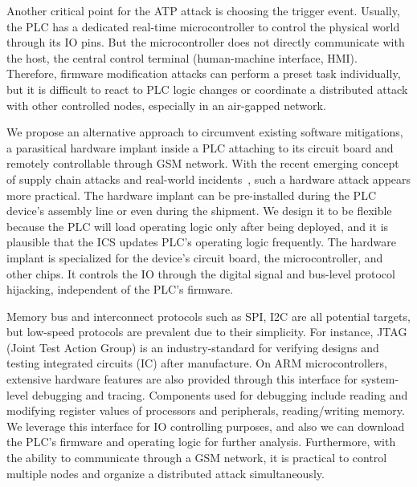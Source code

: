 Another critical point for the ATP attack is choosing the trigger event. Usually, the PLC has a dedicated real-time microcontroller to control the physical world through its IO pins. But the microcontroller does not directly communicate with the host, the central control terminal (human-machine interface, HMI). Therefore, firmware modification attacks can perform a preset task individually, but it is difficult to react to PLC logic changes or coordinate a distributed attack with other controlled nodes, especially in an air-gapped network.

We propose an alternative approach to circumvent existing software mitigations, a parasitical hardware implant inside a PLC attaching to its circuit board and remotely controllable through GSM network.  With the recent emerging concept of supply chain attacks and real-world incidents~\cite{oxfordsolarwinds}, such a hardware attack appears more practical. The hardware implant can be pre-installed during the PLC device's assembly line or even during the shipment. We design it to be flexible because the PLC will load operating logic only after being deployed, and it is plausible that the ICS updates PLC's operating logic frequently. The hardware implant is specialized for the device's circuit board, the microcontroller, and other chips.  It controls the IO through the digital signal and bus-level protocol hijacking, independent of the PLC's firmware.

Memory bus and interconnect protocols such as SPI, I2C are all potential targets, but low-speed protocols are prevalent due to their simplicity. For instance, JTAG (Joint Test Action Group) is an industry-standard for verifying designs and testing integrated circuits (IC) after manufacture. 	On ARM microcontrollers, extensive hardware features are also provided through this interface for system-level debugging and tracing. Components used for debugging include reading and modifying register values of processors and peripherals, reading/writing memory. We leverage this interface for IO controlling purposes, and also we can download the PLC's firmware and operating logic for further analysis. Furthermore, with the ability to communicate through a GSM network, it is practical to control multiple nodes and organize a distributed attack simultaneously.



